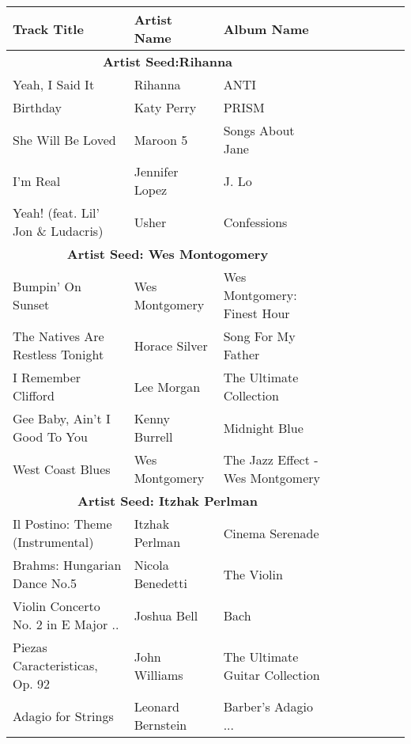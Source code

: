 \begin {tabular}{lllllllll}%
\\%
\textbf {Track Title} & \textbf {Artist Name} & \textbf {Album Name}\\ \midrule \multicolumn {3}{c}{\textbf {Artist Seed:Rihanna}} \\ \midrule Yeah, I Said It&Rihanna&ANTI\\%
Birthday&Katy Perry&PRISM\\%
She Will Be Loved&Maroon 5&Songs About Jane\\%
I'm Real&Jennifer Lopez&J. Lo\\%
Yeah! (feat. Lil' Jon \& Ludacris)&Usher&Confessions\\%
\midrule \multicolumn {3}{c}{\textbf {Artist Seed: Wes Montogomery}} \\ \midrule Bumpin' On Sunset&Wes Montgomery&Wes Montgomery: Finest Hour\\%
The Natives Are Restless Tonight&Horace Silver&Song For My Father\\%
I Remember Clifford&Lee Morgan&The Ultimate Collection\\%
Gee Baby, Ain't I Good To You&Kenny Burrell&Midnight Blue\\%
West Coast Blues&Wes Montgomery&The Jazz Effect - Wes Montgomery\\%
\midrule \multicolumn {3}{c}{\textbf {Artist Seed: Itzhak Perlman}} \\ \midrule Il Postino: Theme (Instrumental)&Itzhak Perlman&Cinema Serenade\\%
Brahms: Hungarian Dance No.5&Nicola Benedetti&The Violin\\%
Violin Concerto No. 2 in E Major ..&Joshua Bell&Bach\\%
Piezas Caracteristicas, Op. 92&John Williams&The Ultimate Guitar Collection\\%
Adagio for Strings&Leonard Bernstein&Barber's Adagio ...\\\bottomrule %
\end {tabular}%

